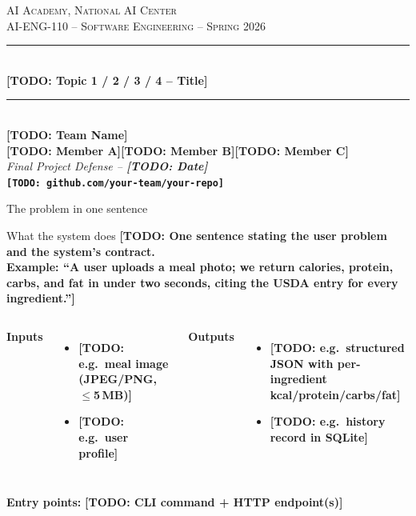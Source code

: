 \documentclass[aspectratio=169,11pt]{beamer}
\newcommand{\teamname}{\TODO{Team Name}}
\newcommand{\topicchoice}{\TODO{Topic 1 / 2 / 3 / 4 -- Title}}
\newcommand{\memberone}{\TODO{Member A}}
\newcommand{\membertwo}{\TODO{Member B}}
\newcommand{\memberthree}{\TODO{Member C}}
\newcommand{\repolink}{\TODO{github.com/your-team/your-repo}}
\newcommand{\coursecode}{AI-ENG-110}
\newcommand{\coursename}{Software Engineering}
\newcommand{\institution}{AI Academy, National AI Center}
\newcommand{\semester}{Spring 2026}
\newcommand{\TODO}[1]{\textcolor{accent2}{\textbf{[TODO: #1]}}}
\begin{document}
{%
\begin{frame}[plain]
  \begin{center}
    \vspace{0.6cm}
    {\small \textsc{\institution}}\\[0.2em]
    {\small \textsc{\coursecode{} -- \coursename{} -- \semester{}}}\\[1.2em]
    \rule{0.7\textwidth}{0.6pt}\\[0.4em]
    {\Huge\bfseries\color{accent} \topicchoice}\\[0.4em]
    \rule{0.7\textwidth}{0.6pt}\\[1.2em]
    {\large \teamname}\\[0.6em]
    {\normalsize \memberone\quad\textbullet\quad\membertwo\quad\textbullet\quad\memberthree}\\[1cm]
    {\footnotesize\itshape Final Project Defense -- \TODO{Date}}\\[0.4em]
    {\footnotesize\texttt{\repolink}}
  \end{center}
\end{frame}
}

\begin{frame}{The problem in one sentence}
  \begin{block}{What the system does}
    \TODO{One sentence stating the user problem and the system's contract. \\[3pt]
    Example: ``A user uploads a meal photo; we return calories, protein, carbs, and fat in under two seconds, citing the USDA entry for every ingredient.''}
  \end{block}

  \vspace{0.3em}
  \begin{columns}[T,onlytextwidth]
  \textbf{Inputs}
  \begin{itemize}
    \item \TODO{e.g.\ meal image (JPEG/PNG, $\le$5\,MB)}
    \item \TODO{e.g.\ user profile}
  \end{itemize}

  \textbf{Outputs}
  \begin{itemize}
    \item \TODO{e.g.\ structured JSON with per-ingredient kcal/protein/carbs/fat}
    \item \TODO{e.g.\ history record in SQLite}
  \end{itemize}
  \end{columns}

  \vspace{0.4em}
  \textbf{Entry points:} \TODO{CLI command + HTTP endpoint(s)}
\end{frame}
\end{document}
